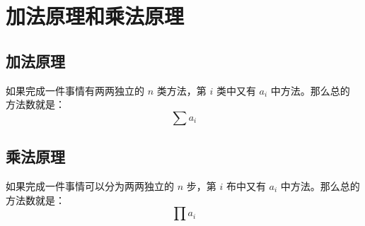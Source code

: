 \section{加法原理和乘法原理}
\subsection{加法原理}
如果完成一件事情有两两独立的 $n$ 类方法，第 $i$ 类中又有 $a_i$ 中方法。那么总的
方法数就是：\[
    \sum a_i
\]

\subsection{乘法原理}
如果完成一件事情可以分为两两独立的 $n$ 步，第 $i$ 布中又有 $a_i$ 中方法。那么总的
方法数就是：\[
    \prod a_i
\]

